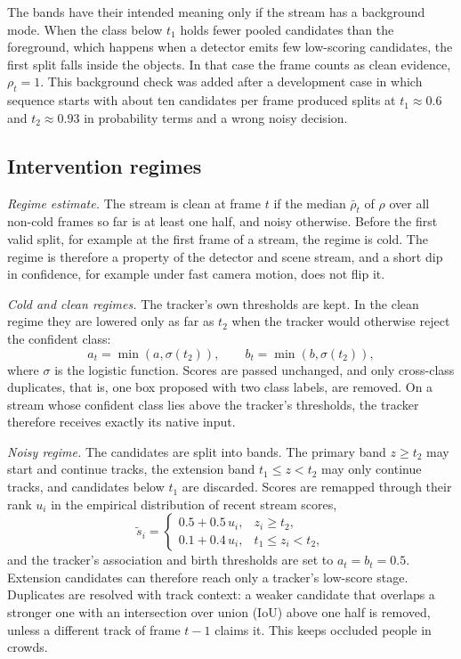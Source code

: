 The bands have their intended meaning only if the stream has a background
mode. When the class below $t_1$ holds fewer pooled candidates than the
foreground, which happens when a detector emits few low-scoring candidates, the
first split falls inside the objects. In that case the frame counts as clean
evidence, $\rho_t=1$. This background check was added after a development
case in which sequence starts with about ten candidates per frame produced
splits at $t_1\approx0.6$ and $t_2\approx0.93$ in probability terms and a
wrong noisy decision.

\subsection{Intervention regimes}\label{sec:regimes}
\emph{Regime estimate.} The stream is clean at frame $t$ if the median
$\bar\rho_t$ of $\rho$ over all non-cold frames so far is at least one half,
and noisy otherwise. Before the first valid split, for example at the first
frame of a stream, the regime is cold. The regime is therefore a property of
the detector and scene stream, and a short dip in confidence, for example under fast camera
motion, does not flip it.

\emph{Cold and clean regimes.} The tracker's own thresholds are kept. In the
clean regime they are lowered only as far as $t_2$ when the tracker would
otherwise reject the confident class:
\begin{equation}
a_t=\min\!\left(a,\sigma(t_2)\right),\qquad b_t=\min\!\left(b,\sigma(t_2)\right),
\label{eq:clean}
\end{equation}
where $\sigma$ is the logistic function. Scores are passed unchanged, and only
cross-class duplicates, that is, one box proposed with two class labels, are
removed. On a stream whose confident class lies above the tracker's
thresholds, the tracker therefore receives exactly its native input.

\emph{Noisy regime.} The candidates are split into bands. The primary band
$z\ge t_2$ may start and continue tracks, the extension band $t_1\le z<t_2$
may only continue tracks, and candidates below $t_1$ are discarded. Scores are
remapped through their rank $u_i$ in the empirical distribution of recent
stream scores,
\begin{equation}
\tilde{s}_i=
\begin{cases}
0.5+0.5\,u_i, & z_i\ge t_2,\\
0.1+0.4\,u_i, & t_1\le z_i<t_2,
\end{cases}
\label{eq:remap}
\end{equation}
and the tracker's association and birth thresholds are set to
$a_t=b_t=0.5$. Extension candidates can therefore reach only a tracker's
low-score stage. Duplicates are resolved with track context: a weaker
candidate that overlaps a stronger one with an intersection over union (IoU)
above one half is removed, unless a different track of frame $t-1$ claims it.
This keeps occluded people in crowds.

